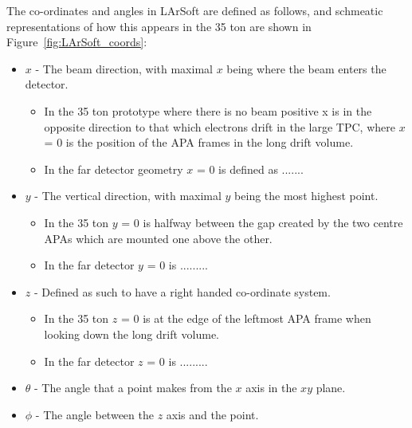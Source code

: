 The co-ordinates and angles in LArSoft are defined as follows, and schmeatic representations of how this appears in the 35 ton are shown in Figure~\ref{fig:LArSoft_coords}:
\begin{itemize}
\item $x$ - The beam direction, with maximal $x$ being where the beam enters the detector.
  \begin{itemize}
  \item In the 35 ton prototype where there is no beam positive x is in the opposite direction to that which electrons drift in the large TPC, where $x$ = 0 is the position of the APA frames in the long drift volume.
  \item In the far detector geometry $x$ = 0 is defined as .......
  \end{itemize}
\item $y$ - The vertical direction, with maximal $y$ being the most highest point.
  \begin{itemize}
  \item In the 35 ton $y$ = 0 is halfway between the gap created by the two centre APAs which are mounted one above the other.
  \item In the far detector $y$ = 0 is .........
  \end {itemize}
\item $z$ - Defined as such to have a right handed co-ordinate system.
  \begin{itemize}
  \item In the 35 ton $z$ = 0 is at the edge of the leftmost APA frame when looking down the long drift volume.
  \item In the far detector $z$ = 0 is .........
  \end{itemize}
\item $\theta$ - The angle that a point makes from the $x$ axis in the $xy$ plane.
\item $\phi$ - The angle between the $z$ axis and the point.
\end{itemize}

